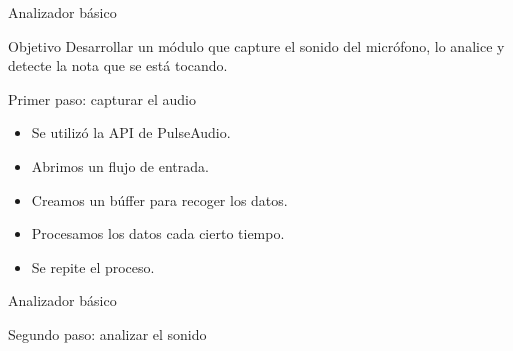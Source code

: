\begin{frame}{Analizador básico}
  \begin{block}{Objetivo}
    Desarrollar un módulo que capture el sonido del micrófono, lo analice y
    detecte la nota que se está tocando.
  \end{block}

  \pause

  \begin{block}{Primer paso: capturar el audio}
    \begin{itemize}
    \item Se utilizó la API de PulseAudio.
    \item Abrimos un flujo de entrada.
    \item Creamos un búffer para recoger los datos.
    \item Procesamos los datos cada cierto tiempo.
    \item Se repite el proceso.
    \end{itemize}
    
  \end{block}
\end{frame}

\begin{frame}{Analizador básico}
  \begin{block}{Segundo paso: analizar el sonido}
    
  \end{block}  
\end{frame}

